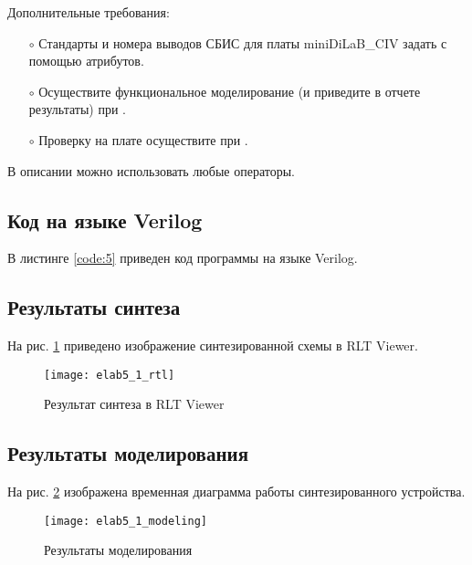 Дополнительные требования:
\begin{itemize}
	\item[$\circ$] Стандарты и номера выводов СБИС для платы miniDiLaB\_CIV задать с помощью атрибутов.
	\item[$\circ$] Осуществите функциональное моделирование (и приведите в отчете результаты) при .
	\item[$\circ$] Проверку на плате осуществите при .
\end{itemize}

В описании можно использовать любые операторы.

\subsection{Код на языке Verilog}

В листинге \ref{code:5} приведен код программы на языке Verilog.



\newpage

\subsection{Результаты синтеза}

На рис. \ref{fig:elab5_1_rtl} приведено изображение синтезированной схемы в RLT Viewer.

\begin{figure}[H]
\begin{center}
	\texttt{[image: elab5\_1\_rtl]}
	\caption{Результат синтеза в RLT Viewer}
	\label{fig:elab5_1_rtl}
\end{center}
\end{figure}

\subsection{Результаты моделирования}
\label{sec:elab5_1_modeling}

На рис. \ref{fig:elab5_1_modeling} изображена временная диаграмма работы синтезированного устройства. 

\begin{figure}[H]
\begin{center}
	\texttt{[image: elab5\_1\_modeling]}
	\caption{Результаты моделирования}
	\label{fig:elab5_1_modeling}
\end{center}
\end{figure}

